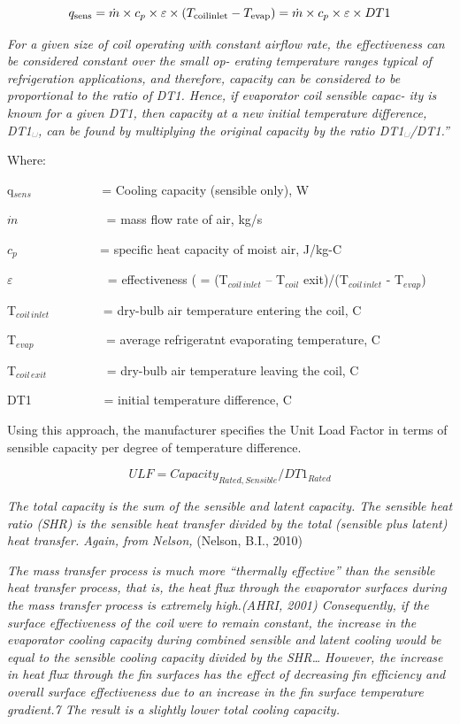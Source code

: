 \begin{equation}
{q_{{\rm{sens}}}} = \dot m \times {c_p} \times \varepsilon  \times ({T_{{\rm{coil inlet}}}} - {T_{{\rm{evap}}}}) = \dot m \times {c_p} \times \varepsilon  \times DT1
\end{equation}

\emph{For a given size of coil operating with constant airflow rate, the effectiveness can be considered constant over the small op- erating temperature ranges typical of refrigeration applications, and therefore, capacity can be considered to be proportional to the ratio of DT1. Hence, if evaporator coil sensible capac- ity is known for a given DT1, then capacity at a new initial temperature difference, DT1␣, can be found by multiplying the original capacity by the ratio DT1␣/DT1.''}

Where:

q\(_{sens}\) ~~~~~~~~~~ = Cooling capacity (sensible only), W

\(\dot m\) ~~~~~~~~~~~~~ = mass flow rate of air, kg/s

\({c_p}\) ~~~~~~~~~~~~ = specific heat capacity of moist air, J/kg-C

\(\varepsilon\) ~~~~~~~~~~~~~~ = effectiveness ( = (T\(_{coil\, inlet}\) -- T\(_{coil}\) exit)/(T\(_{coil\, inlet}\) - T\(_{evap}\))

T\(_{coil\, inlet}\)~~~~~~~~ = dry-bulb air temperature entering the coil, C

T\(_{evap}\)~~~~~~~~~~~ = average refrigeratnt evaporating temperature, C

T\(_{coil\, exit}\)~~~~~~~~~ = dry-bulb air temperature leaving the coil, C

DT1~~~~~~~~~~~ = initial temperature difference, C

Using this approach, the manufacturer specifies the Unit Load Factor in terms of sensible capacity per degree of temperature difference.

\begin{equation}
ULF = Capacit{y_{Rated,Sensible}}/DT{1_{Rated}}
\end{equation}

\emph{The total capacity is the sum of the sensible and latent capacity. The sensible heat ratio (SHR) is the sensible heat transfer divided by the total (sensible plus latent) heat transfer. Again, from Nelson,} (Nelson, B.I., 2010)

\emph{The mass transfer process is much more ``thermally effective'' than the sensible heat transfer process, that is, the heat flux through the evaporator surfaces during the mass transfer process is extremely high.(AHRI, 2001) Consequently, if the surface effectiveness of the coil were to remain constant, the increase in the evaporator cooling capacity during combined sensible and latent cooling would be equal to the sensible cooling capacity divided by the SHR\ldots{} However, the increase in heat flux through the fin surfaces has the effect of decreasing fin efficiency and overall surface effectiveness due to an increase in the fin surface temperature gradient.7 The result is a slightly lower total cooling capacity.}

